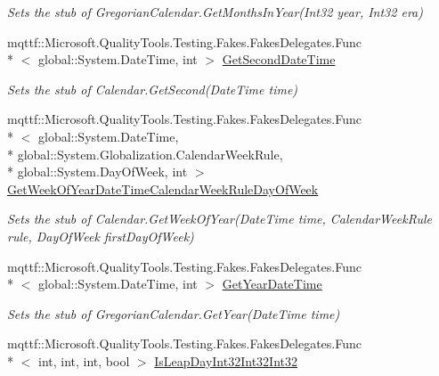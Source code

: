 \begin{DoxyCompactItemize}
\begin{DoxyCompactList}\small\item\em Sets the stub of Gregorian\-Calendar.\-Get\-Months\-In\-Year(\-Int32 year, Int32 era)\end{DoxyCompactList}\item 
mqttf\-::\-Microsoft.\-Quality\-Tools.\-Testing.\-Fakes.\-Fakes\-Delegates.\-Func\\*
$<$ global\-::\-System.\-Date\-Time, int $>$ \hyperlink{class_system_1_1_globalization_1_1_fakes_1_1_stub_gregorian_calendar_a6e2a20d203b41609f0696712cff8e083}{Get\-Second\-Date\-Time}
\begin{DoxyCompactList}\small\item\em Sets the stub of Calendar.\-Get\-Second(\-Date\-Time time)\end{DoxyCompactList}\item 
mqttf\-::\-Microsoft.\-Quality\-Tools.\-Testing.\-Fakes.\-Fakes\-Delegates.\-Func\\*
$<$ global\-::\-System.\-Date\-Time, \\*
global\-::\-System.\-Globalization.\-Calendar\-Week\-Rule, \\*
global\-::\-System.\-Day\-Of\-Week, int $>$ \hyperlink{class_system_1_1_globalization_1_1_fakes_1_1_stub_gregorian_calendar_a80593d0817760e4dfa7d33987f936da1}{Get\-Week\-Of\-Year\-Date\-Time\-Calendar\-Week\-Rule\-Day\-Of\-Week}
\begin{DoxyCompactList}\small\item\em Sets the stub of Calendar.\-Get\-Week\-Of\-Year(\-Date\-Time time, Calendar\-Week\-Rule rule, Day\-Of\-Week first\-Day\-Of\-Week)\end{DoxyCompactList}\item 
mqttf\-::\-Microsoft.\-Quality\-Tools.\-Testing.\-Fakes.\-Fakes\-Delegates.\-Func\\*
$<$ global\-::\-System.\-Date\-Time, int $>$ \hyperlink{class_system_1_1_globalization_1_1_fakes_1_1_stub_gregorian_calendar_afd53ffc3f84478039ff2576e53b0410d}{Get\-Year\-Date\-Time}
\begin{DoxyCompactList}\small\item\em Sets the stub of Gregorian\-Calendar.\-Get\-Year(\-Date\-Time time)\end{DoxyCompactList}\item 
mqttf\-::\-Microsoft.\-Quality\-Tools.\-Testing.\-Fakes.\-Fakes\-Delegates.\-Func\\*
$<$ int, int, int, bool $>$ \hyperlink{class_system_1_1_globalization_1_1_fakes_1_1_stub_gregorian_calendar_abc53c511f074336d802e309bc02d5279}{Is\-Leap\-Day\-Int32\-Int32\-Int32}

\end{DoxyCompactItemize}
